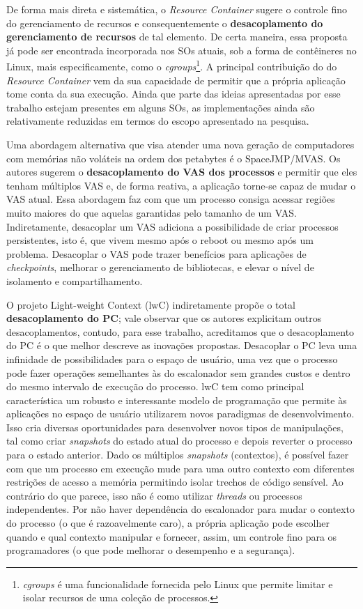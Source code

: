 De forma mais direta e sistemática, o \textit{Resource Container} sugere o
controle fino do gerenciamento de recursos e consequentemente o
\textbf{desacoplamento do gerenciamento de recursos} de tal elemento. De certa
maneira, essa proposta já pode ser encontrada incorporada nos SOs atuais, sob a
forma de contêineres no Linux, mais especificamente, como o
\textit{cgroups}\footnote{\emph{cgroups} é uma funcionalidade fornecida pelo
Linux que permite limitar e isolar recursos de uma coleção de processos.}. A
principal contribuição do do \emph{Resource Container} vem da sua capacidade de permitir que a
própria aplicação tome conta da sua execução.  Ainda que parte das ideias
apresentadas por esse trabalho estejam presentes em alguns SOs, as
implementações ainda são relativamente reduzidas em termos do escopo
apresentado na pesquisa.

Uma abordagem alternativa que visa atender uma nova geração de computadores com
memórias não voláteis na ordem dos petabytes é o SpaceJMP/MVAS.  Os autores
sugerem o \textbf{desacoplamento do VAS dos processos} e permitir que eles tenham
múltiplos VAS e, de forma reativa, a aplicação torne-se capaz de mudar o VAS
atual. Essa abordagem faz com que um processo consiga acessar regiões muito
maiores do que aquelas garantidas pelo tamanho de um VAS. Indiretamente,
desacoplar um VAS adiciona a possibilidade de criar processos persistentes,
isto é, que vivem mesmo após o reboot ou mesmo após um problema. Desacoplar o VAS
pode trazer benefícios para aplicações de \textit{checkpoints}, melhorar o
gerenciamento de bibliotecas, e elevar o nível de isolamento e compartilhamento.

O projeto  Light-weight Context (lwC) indiretamente propõe o total
\textbf{desacoplamento do PC}; vale observar que os autores explicitam outros
desacoplamentos, contudo, para esse trabalho, acreditamos que o desacoplamento
do PC é o que melhor descreve as inovações propostas. Desacoplar o PC leva uma
infinidade de possibilidades para o espaço de usuário, uma vez que o processo
pode fazer operações semelhantes às do escalonador sem grandes custos e dentro
do mesmo intervalo de execução do processo. lwC tem como principal
característica um robusto e interessante modelo de programação que permite
às aplicações no espaço de usuário utilizarem novos paradigmas de desenvolvimento.
Isso cria diversas oportunidades para desenvolver novos tipos de manipulações,
tal como criar \emph{snapshots} do estado atual do processo e depois reverter o
processo para o estado anterior. Dado os múltiplos \emph{snapshots}
(contextos), é possível fazer com que um processo em execução mude para uma
outro contexto com diferentes restrições de acesso a memória permitindo isolar
trechos de código sensível.  Ao contrário do que parece, isso não é como
utilizar \emph{threads} ou processos independentes. Por não haver dependência
do escalonador para mudar o contexto do processo (o que é razoavelmente caro),
a própria aplicação pode escolher quando e qual contexto manipular e fornecer,
assim, um controle fino para os programadores (o que pode melhorar o desempenho
e a segurança).

